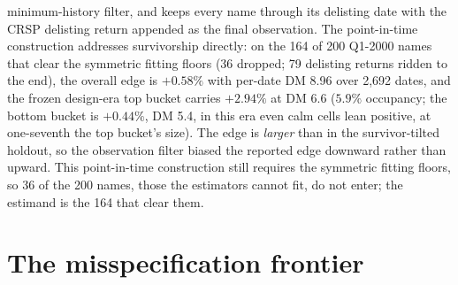 \documentclass[11pt]{article}
\theoremstyle{remark}
\begin{document}
minimum-history filter, and keeps every name through its delisting
date with the CRSP delisting return appended as the final
observation.
The point-in-time construction addresses survivorship directly: on
the 164 of 200 Q1-2000 names that clear the symmetric fitting floors
(36 dropped; 79 delisting returns ridden to the end), the overall
edge is $+0.58\%$ with per-date DM 8.96 over 2{,}692 dates, and the
frozen design-era top bucket carries $+2.94\%$ at DM 6.6 ($5.9\%$
occupancy; the bottom bucket is $+0.44\%$, DM 5.4, in this era even calm cells lean positive, at one-seventh the top bucket's size).
The edge is \emph{larger} than in the survivor-tilted holdout, so the
observation filter biased the reported edge downward rather than
upward. This point-in-time construction still requires the symmetric
fitting floors, so 36 of the 200 names, those the estimators cannot
fit, do not enter; the estimand is the 164 that clear them.

\section{The misspecification frontier}\label{sec:frontier}
\end{document}
